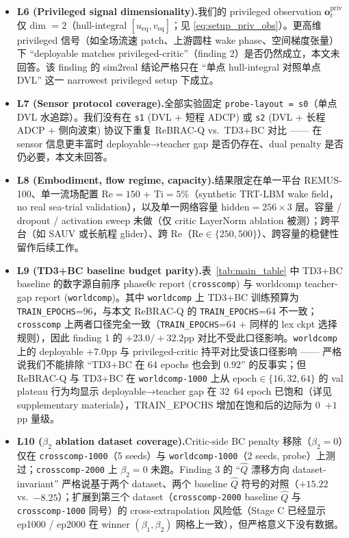 \begin{itemize}
    \item \textbf{L6 (Privileged signal dimensionality).}\quad 我们的 privileged observation $\mathbf{o}_t^{\mathrm{priv}}$ 仅 dim $= 2$（hull-integral $[u_{\mathrm{eq}}, v_{\mathrm{eq}}]$；见 \eqref{eq:setup_priv_obs}）。更高维 privileged 信号（如全场流速 patch、上游圆柱 wake phase、空间梯度张量）下 ``deployable matches privileged-critic''（finding 2）是否仍然成立，本文未回答。该 finding 的 sim2real 结论严格只在 ``单点 hull-integral 对照单点 DVL'' 这一 narrowest privileged setup 下成立。

    \item \textbf{L7 (Sensor protocol coverage).}\quad 全部实验固定 \texttt{probe-layout = s0}（单点 DVL 水追踪）。我们没有在 \texttt{s1} (DVL + 短程 ADCP) 或 \texttt{s2} (DVL + 长程 ADCP + 侧向波束) 协议下重复 ReBRAC-Q vs.~TD3+BC 对比 —— 在 sensor 信息更丰富时 deployable→teacher gap 是否仍存在、dual penalty 是否仍必要，本文未回答。

    \item \textbf{L8 (Embodiment, flow regime, capacity).}\quad 结果限定在单一平台 REMUS-100、单一流场配置 $\mathrm{Re} = 150$ + $\mathrm{Ti} = 5\%$（synthetic TRT-LBM wake field，no real sea-trial validation），以及单一网络容量 $\mathrm{hidden} = 256 \times 3$ 层。容量 / dropout / activation sweep 未做（仅 critic LayerNorm ablation 被测）；跨平台（如 SAUV 或长航程 glider）、跨 Re（$\mathrm{Re} \in \{250, 500\}$）、跨容量的稳健性留作后续工作。

    \item \textbf{L9 (TD3+BC baseline budget parity).}\quad 表~\ref{tab:main_table} 中 TD3+BC baseline 的数字源自前序 phase0c report (\texttt{crosscomp}) 与 worldcomp teacher-gap report (\texttt{worldcomp})。其中 \texttt{worldcomp} 上 TD3+BC 训练预算为 \texttt{TRAIN\_EPOCHS}=96，与本文 ReBRAC-Q 的 \texttt{TRAIN\_EPOCHS}=64 不一致；\texttt{crosscomp} 上两者口径完全一致（\texttt{TRAIN\_EPOCHS}=64 + 同样的 lex ckpt 选择规则），因此 finding 1 的 $+23.0/+32.2$pp 对比不受此口径影响。\texttt{worldcomp} 上的 deployable $+7.0$pp 与 privileged-critic 持平对比受该口径影响 —— 严格说我们不能排除 ``TD3+BC 在 64 epochs 也会到 $0.92$'' 的反事实；但 ReBRAC-Q 与 TD3+BC 在 \texttt{worldcomp-1000} 上从 $\mathrm{epoch} \in \{16, 32, 64\}$ 的 val plateau 行为均显示 deployable→teacher gap 在 32~64 epoch 已饱和（详见 supplementary materials），TRAIN\_EPOCHS 增加在饱和后的边际为 $0$~$+1$pp 量级。

    \item \textbf{L10 ($\beta_2$ ablation dataset coverage).}\quad Critic-side BC penalty 移除（$\beta_2 = 0$）仅在 \texttt{crosscomp-1000}（5 seeds）与 \texttt{worldcomp-1000}（2 seeds, probe）上测过；\texttt{crosscomp-2000} 上 $\beta_2 = 0$ 未跑。Finding 3 的 ``$\hat{Q}$ 漂移方向 dataset-invariant'' 严格说基于两个 dataset、两个 baseline $\hat{Q}$ 符号的对照（$+15.22$ vs.~$-8.25$）；扩展到第三个 dataset（\texttt{crosscomp-2000} baseline $\hat{Q}$ 与 \texttt{crosscomp-1000} 同号）的 cross-extrapolation 风险低（Stage C 已经显示 ep1000 / ep2000 在 winner $(\beta_1, \beta_2)$ 网格上一致），但严格意义下没有数据。


\end{itemize}
